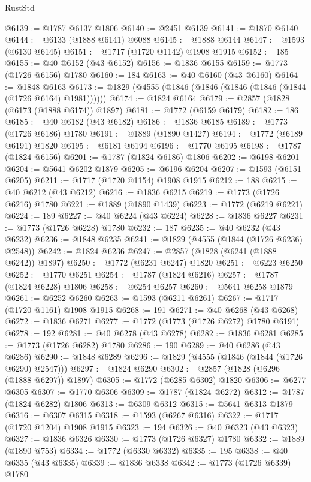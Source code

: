 \begin{lexlean}{RustStd}
\begin{coremodule}
@6139 := @1787 @6137 @1806
@6140 := @2451 @6139
@6141 := @1870 @6140
@6144 := @6133 (@1888 @6141) @6088
@6145 := @1888 @6144
@6147 := @1593 (@6130 @6145)
@6151 := @1717 (@1720 @1142) @1908 @1915
@6152 := 185
@6155 := @40 @6152 (@43 @6152)
@6156 := @1836 @6155
@6159 := @1773 (@1726 @6156) @1780
@6160 := 184
@6163 := @40 @6160 (@43 @6160)
@6164 := @1848 @6163
@6173 := @1829 (@4555 (@1846 (@1846 (@1846 (@1846 (@1844 (@1726 @6164) @1981))))))
@6174 := @1824 @6164
@6179 := @2857 (@1828 (@6173 (@1888 @6174)) @1897)
@6181 := @1772 (@6159 @6179)
@6182 := 186
@6185 := @40 @6182 (@43 @6182)
@6186 := @1836 @6185
@6189 := @1773 (@1726 @6186) @1780
@6191 := @1889 (@1890 @1427)
@6194 := @1772 (@6189 @6191) @1820
@6195 := @6181 @6194
@6196 := @1770 @6195
@6198 := @1787 (@1824 @6156)
@6201 := @1787 (@1824 @6186) @1806
@6202 := @6198 @6201
@6204 := @5641 @6202 @1879
@6205 := @6196 @6204
@6207 := @1593 (@6151 @6205)
@6211 := @1717 (@1720 @1154) @1908 @1915
@6212 := 188
@6215 := @40 @6212 (@43 @6212)
@6216 := @1836 @6215
@6219 := @1773 (@1726 @6216) @1780
@6221 := @1889 (@1890 @1439)
@6223 := @1772 (@6219 @6221)
@6224 := 189
@6227 := @40 @6224 (@43 @6224)
@6228 := @1836 @6227
@6231 := @1773 (@1726 @6228) @1780
@6232 := 187
@6235 := @40 @6232 (@43 @6232)
@6236 := @1848 @6235
@6241 := @1829 (@4555 (@1844 (@1726 @6236) @2548))
@6242 := @1824 @6236
@6247 := @2857 (@1828 (@6241 (@1888 @6242)) @1897)
@6250 := @1772 (@6231 @6247) @1820
@6251 := @6223 @6250
@6252 := @1770 @6251
@6254 := @1787 (@1824 @6216)
@6257 := @1787 (@1824 @6228) @1806
@6258 := @6254 @6257
@6260 := @5641 @6258 @1879
@6261 := @6252 @6260
@6263 := @1593 (@6211 @6261)
@6267 := @1717 (@1720 @1161) @1908 @1915
@6268 := 191
@6271 := @40 @6268 (@43 @6268)
@6272 := @1836 @6271
@6277 := @1772 (@1773 (@1726 @6272) @1780 @6191)
@6278 := 192
@6281 := @40 @6278 (@43 @6278)
@6282 := @1836 @6281
@6285 := @1773 (@1726 @6282) @1780
@6286 := 190
@6289 := @40 @6286 (@43 @6286)
@6290 := @1848 @6289
@6296 := @1829 (@4555 (@1846 (@1844 (@1726 @6290) @2547)))
@6297 := @1824 @6290
@6302 := @2857 (@1828 (@6296 (@1888 @6297)) @1897)
@6305 := @1772 (@6285 @6302) @1820
@6306 := @6277 @6305
@6307 := @1770 @6306
@6309 := @1787 (@1824 @6272)
@6312 := @1787 (@1824 @6282) @1806
@6313 := @6309 @6312
@6315 := @5641 @6313 @1879
@6316 := @6307 @6315
@6318 := @1593 (@6267 @6316)
@6322 := @1717 (@1720 @1204) @1908 @1915
@6323 := 194
@6326 := @40 @6323 (@43 @6323)
@6327 := @1836 @6326
@6330 := @1773 (@1726 @6327) @1780
@6332 := @1889 (@1890 @753)
@6334 := @1772 (@6330 @6332)
@6335 := 195
@6338 := @40 @6335 (@43 @6335)
@6339 := @1836 @6338
@6342 := @1773 (@1726 @6339) @1780

\end{coremodule}
\end{lexlean}
